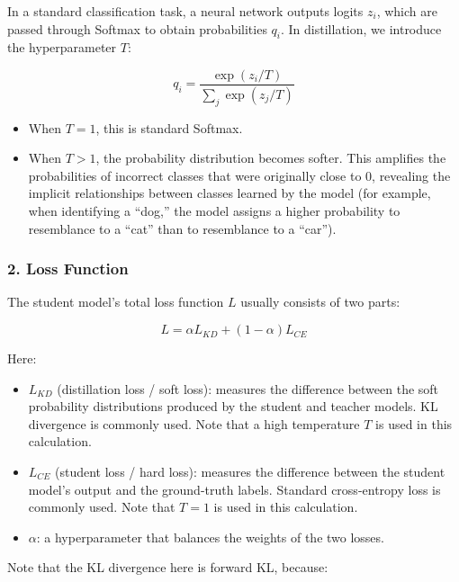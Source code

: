In a standard classification task, a neural network outputs logits \(z_i\), which are passed through Softmax to obtain probabilities \(q_i\). In distillation, we introduce the hyperparameter \(T\):

\[
q_i = \frac{\exp(z_i / T)}{\sum_j \exp(z_j / T)}
\]

\begin{itemize}
\tightlist
\item
  When \(T = 1\), this is standard Softmax.
\item
  When \(T > 1\), the probability distribution becomes softer. This amplifies the probabilities of incorrect classes that were originally close to 0, revealing the implicit relationships between classes learned by the model (for example, when identifying a ``dog,'' the model assigns a higher probability to resemblance to a ``cat'' than to resemblance to a ``car'').
\end{itemize}

\hypertarget{loss-function}{%
\subsubsection{2. Loss Function}\label{loss-function}}

The student model's total loss function \(L\) usually consists of two parts:

\[
L = \alpha L_{KD} + (1 - \alpha)L_{CE}
\]

Here:

\begin{itemize}
\tightlist
\item
  \(L_{KD}\) (distillation loss / soft loss): measures the difference between the soft probability distributions produced by the student and teacher models. KL divergence is commonly used. Note that a high temperature \(T\) is used in this calculation.
\item
  \(L_{CE}\) (student loss / hard loss): measures the difference between the student model's output and the ground-truth labels. Standard cross-entropy loss is commonly used. Note that \(T = 1\) is used in this calculation.
\item
  \(\alpha\): a hyperparameter that balances the weights of the two losses.
\end{itemize}

Note that the KL divergence here is forward KL, because:


